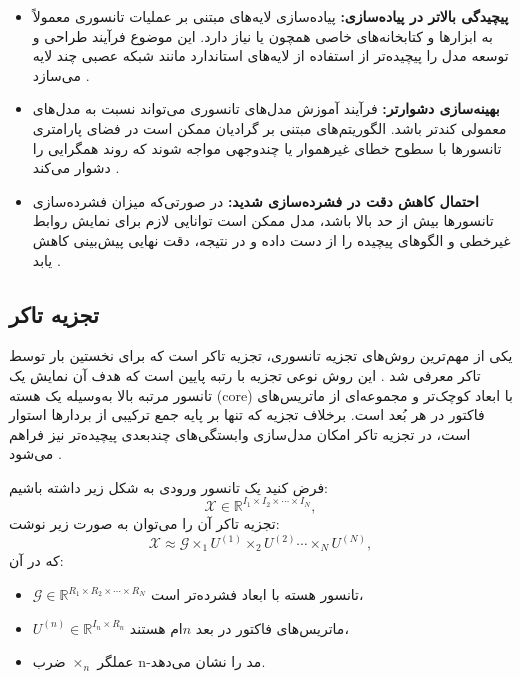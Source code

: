 \begin{itemize}
	\item \textbf{پیچیدگی بالاتر در پیاده‌سازی:} پیاده‌سازی لایه‌های مبتنی بر عملیات تانسوری معمولاً به ابزارها و کتابخانه‌های خاصی همچون  یا  نیاز دارد. این موضوع فرآیند طراحی و توسعه مدل را پیچیده‌تر از استفاده از لایه‌های استاندارد مانند شبکه عصبی چند لایه می‌سازد \cite{kossaifi2017tensorcontraction}.
	
	\item \textbf{بهینه‌سازی دشوارتر:} فرآیند آموزش مدل‌های تانسوری می‌تواند نسبت به مدل‌های معمولی کندتر باشد. الگوریتم‌های مبتنی بر گرادیان ممکن است در فضای پارامتری تانسورها با سطوح خطای غیرهموار یا چندوجهی مواجه شوند که روند همگرایی را دشوار می‌کند \cite{yang2017ttrnn}.
	
	\item \textbf{احتمال کاهش دقت در فشرده‌سازی شدید:} در صورتی‌که میزان فشرده‌سازی تانسورها بیش از حد بالا باشد، مدل ممکن است توانایی لازم برای نمایش روابط غیرخطی و الگوهای پیچیده را از دست داده و در نتیجه، دقت نهایی پیش‌بینی کاهش یابد \cite{kossaifi2020tensorregression}.
\end{itemize}





\subsection{تجزیه تاکر}

یکی از مهم‌ترین روش‌های تجزیه تانسوری، تجزیه تاکر است که برای نخستین بار توسط تاکر معرفی شد \cite{tucker1966some}. 
این روش نوعی تجزیه با رتبه پایین است که هدف آن نمایش یک تانسور مرتبه بالا به‌وسیله یک هسته (core) با ابعاد کوچک‌تر و مجموعه‌ای از ماتریس‌های فاکتور در هر بُعد است. 
برخلاف تجزیه  که تنها بر پایه جمع ترکیبی از بردارها استوار است، در تجزیه تاکر امکان مدل‌سازی وابستگی‌های چندبعدی پیچیده‌تر نیز فراهم می‌شود \cite{kolda2009tensor}.

فرض کنید یک تانسور ورودی به شکل زیر داشته باشیم:
\[
\mathcal{X} \in \mathbb{R}^{I_1 \times I_2 \times \cdots \times I_N},
\]
تجزیه تاکر آن را می‌توان به صورت زیر نوشت:
\[
\mathcal{X} \approx \mathcal{G} \times_1 U^{(1)} \times_2 U^{(2)} \cdots \times_N U^{(N)},
\]
که در آن:
\begin{itemize}
	\item $\mathcal{G} \in \mathbb{R}^{R_1 \times R_2 \times \cdots \times R_N}$ تانسور هسته با ابعاد فشرده‌تر است،
	\item $U^{(n)} \in \mathbb{R}^{I_n \times R_n}$ ماتریس‌های فاکتور در بعد $n$ام هستند،
	\item عملگر $\times_n$ ضرب n-مد را نشان می‌دهد.
\end{itemize}


